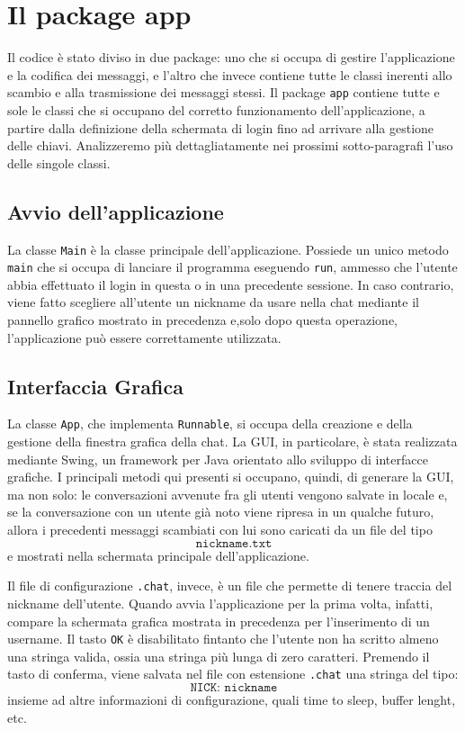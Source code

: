 \section{Il package app}
Il codice è stato diviso in due package: uno che si occupa di gestire l'applicazione
e la codifica dei messaggi, e l'altro che invece contiene tutte le classi inerenti
allo scambio e alla trasmissione dei messaggi stessi.
Il package \texttt{app} contiene tutte e sole le classi che si occupano del corretto
funzionamento dell'applicazione, a partire dalla definizione della schermata di login
fino ad arrivare alla gestione delle chiavi. Analizzeremo più dettagliatamente
nei prossimi sotto-paragrafi l'uso delle singole classi.

\subsection{Avvio dell'applicazione}
La classe \texttt{Main} è la classe principale dell'applicazione.
Possiede un unico metodo \texttt{main} che
si occupa di lanciare il programma eseguendo \texttt{run},
ammesso che l'utente abbia effettuato il login in questa
o in una precedente sessione.
In caso contrario, viene fatto scegliere all'utente un nickname da usare nella chat
mediante il pannello grafico mostrato in precedenza e,solo dopo questa operazione,
l'applicazione può essere correttamente utilizzata.

\subsection{Interfaccia Grafica}
La classe \texttt{App}, che implementa \texttt{Runnable}, si occupa della
creazione e della gestione della finestra grafica della chat. La GUI,
in particolare, è stata realizzata mediante Swing, un framework per Java
orientato allo sviluppo di interfacce grafiche.
I principali metodi qui presenti si occupano, quindi, di generare la GUI, ma non
solo: le conversazioni avvenute fra gli utenti vengono salvate in locale e, se
la conversazione con un utente già noto viene ripresa in un qualche futuro, allora
i precedenti messaggi scambiati con lui sono caricati da un file del tipo
$$ \texttt{nickname.txt} $$ 
e mostrati nella schermata principale dell'applicazione.

Il file di configurazione \texttt{.chat}, invece, è un file che permette di
tenere traccia del nickname dell'utente. Quando avvia l'applicazione per la
prima volta, infatti, compare la schermata grafica mostrata in precedenza per l'inserimento
di un username. Il tasto \texttt{OK} è disabilitato fintanto che l'utente non ha
scritto almeno una stringa valida, ossia una stringa più lunga di zero caratteri.
Premendo il tasto di conferma, viene salvata nel file con estensione \texttt{.chat}
una stringa del tipo:
$$ \texttt{NICK: nickname} $$
insieme ad altre informazioni di configurazione, quali time to sleep, buffer lenght, etc.

